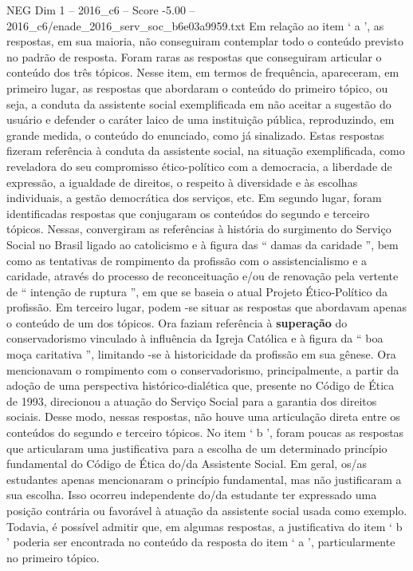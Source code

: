 \begin{textsample}{NEG Dim 1 – 2016\_c6 – Score -5.00 – 2016\_c6/enade\_2016\_serv\_soc\_b6e03a9959.txt}
Em relação ao item ‘ a ’, as respostas, em sua maioria, não conseguiram contemplar todo o conteúdo previsto no padrão de resposta.
Foram raras as respostas que conseguiram articular o conteúdo dos três tópicos.
Nesse item, em termos de frequência, apareceram, em primeiro lugar, as respostas que abordaram o conteúdo do primeiro tópico, ou seja, a conduta da assistente social exemplificada em não aceitar a sugestão do usuário e defender o caráter laico de uma instituição pública, reproduzindo, em grande medida, o conteúdo do enunciado, como já sinalizado.
Estas respostas fizeram referência à conduta da assistente social, na situação exemplificada, como reveladora do seu compromisso ético-político com a democracia, a liberdade de expressão, a igualdade de direitos, o respeito à diversidade e às escolhas individuais, a gestão democrática dos serviços, etc.
Em segundo lugar, foram identificadas respostas que conjugaram os conteúdos do segundo e terceiro tópicos.
Nessas, convergiram as referências à história do surgimento do Serviço Social no Brasil ligado ao catolicismo e à figura das “ damas da caridade ”, bem como as tentativas de rompimento da profissão com o assistencialismo e a caridade, através do processo de reconceituação e/ou de renovação pela vertente de “ intenção de ruptura ”, em que se baseia o atual Projeto Ético-Político da profissão.
Em terceiro lugar, podem -se situar as respostas que abordavam apenas o conteúdo de um dos tópicos.
Ora faziam referência à \textbf{superação} do conservadorismo vinculado à influência da Igreja Católica e à figura da “ boa moça caritativa ”, limitando -se à historicidade da profissão em sua gênese.
Ora mencionavam o rompimento com o conservadorismo, principalmente, a partir da adoção de uma perspectiva histórico-dialética que, presente no Código de Ética de 1993, direcionou a atuação do Serviço Social para a garantia dos direitos sociais.
Desse modo, nessas respostas, não houve uma articulação direta entre os conteúdos do segundo e terceiro tópicos.
No item ‘ b ’, foram poucas as respostas que articularam uma justificativa para a escolha de um determinado princípio fundamental do Código de Ética do/da Assistente Social.
Em geral, os/as estudantes apenas mencionaram o princípio fundamental, mas não justificaram a sua escolha.
Isso ocorreu independente do/da estudante ter expressado uma posição contrária ou favorável à atuação da assistente social usada como exemplo.
Todavia, é possível admitir que, em algumas respostas, a justificativa do item ‘ b ’ poderia ser encontrada no conteúdo da resposta do item ‘ a ’, particularmente no primeiro tópico.

\end{textsample}
